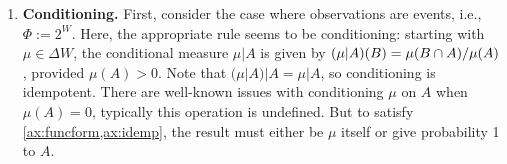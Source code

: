 \begin{enumerate}[wide, label=\textbf{\thesubsection.\arabic*}]
	\item %
	\textbf{Conditioning.}
	First, consider the case where observations are events, i.e., $\Phi := 2^W$.
	Here, the appropriate rule seems to be conditioning:
	starting with $\mu \in \Delta W$, the conditional measure 
	$\mu|A$ is given by $(\mu|A)(B) = {\mu(B \cap A)}/{\mu(A)}$, provided $\mu(A) > 0$.
	Note that $(\mu|A)|A = \mu|A$, so conditioning is idempotent. 
	There are well-known issues with conditioning $\mu$ on $A$ when
	$\mu(A) = 0$, typically this operation is undefined. 
	But to satisfy \cref{ax:funcform,ax:idemp}, the result must either
	be $\mu$ itself or 
	give probability 1 to $A$.


\end{enumerate}
